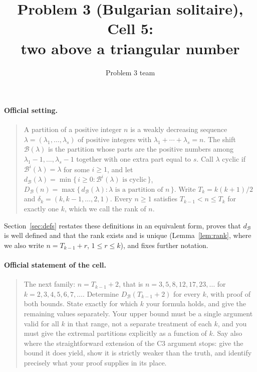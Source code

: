 \documentclass[11pt]{article}
\author{Problem 3 team}
\title{Problem 3 (Bulgarian solitaire), Cell 5:\\ two above a triangular number}
\date{}
\theoremstyle{definition}
\newcommand{\B}{\mathcal{B}}
\newcommand{\dB}{d_{\mathcal{B}}}
\newcommand{\DB}{D_{\mathcal{B}}}
\renewcommand{\le}{\leqslant}
\renewcommand{\ge}{\geqslant}
\begin{document}
\maketitle

\paragraph{Official setting.}
\begin{quote}
A partition of a positive integer $n$ is a weakly decreasing sequence $\lambda=(\lambda_1,\dots,\lambda_s)$ of
positive integers with $\lambda_1+\cdots+\lambda_s=n$.  The shift $\B(\lambda)$ is the partition whose parts are the
positive numbers among $\lambda_1-1,\dots,\lambda_s-1$ together with one extra part equal to $s$.  Call $\lambda$
cyclic if $\B^i(\lambda)=\lambda$ for some $i\ge1$, and let $\dB(\lambda)=\min\{\,i\ge0:\B^i(\lambda)\text{ is cyclic}\,\}$,
$\DB(n)=\max\{\,\dB(\lambda):\lambda\text{ is a partition of }n\,\}$.  Write $T_k=k(k+1)/2$ and
$\delta_k=(k,k-1,\dots,2,1)$.  Every $n\ge1$ satisfies $T_{k-1}<n\le T_k$ for exactly one $k$, which we call the
rank of $n$.
\end{quote}
Section~\ref{sec:defs} restates these definitions in an equivalent form, proves that $\dB$ is well defined and
that the rank exists and is unique (Lemma~\ref{lem:rank}, where we also write $n=T_{k-1}+r$, $1\le r\le k$), and
fixes further notation.

\paragraph{Official statement of the cell.}
\begin{quote}
The next family: $n=T_{k-1}+2$, that is $n=3,5,8,12,17,23,\dots$ for $k=2,3,4,5,6,7,\dots$.  Determine
$\DB(T_{k-1}+2)$ for every $k$, with proof of both bounds.  State exactly for which $k$ your formula holds, and give
the remaining values separately.  Your upper bound must be a single argument valid for all $k$ in that range, not a
separate treatment of each $k$, and you must give the extremal partitions explicitly as a function of $k$.  Say also
where the straightforward extension of the C3 argument stops: give the bound it does yield, show it is strictly
weaker than the truth, and identify precisely what your proof supplies in its place.
\end{quote}
\end{document}
